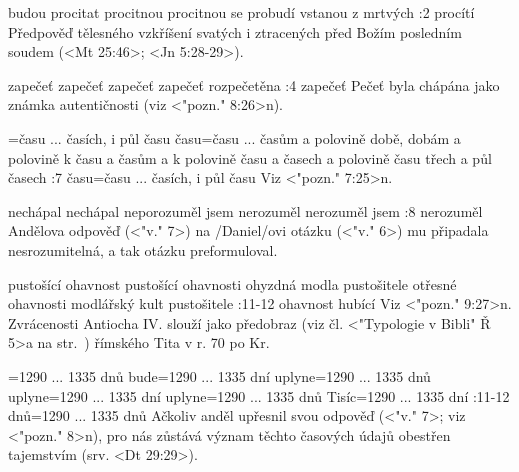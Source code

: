    {budou procitat} %
    {procitnou}  %
    {procitnou} %
    {se probudí}  %
    {vstanou z mrtvých}  %
:2 {procítí} Předpověď tělesného vzkříšení svatých i ztracených před Božím posledním soudem (<Mt 25:46>; <Jn 5:28-29>).

    {zapečeť} %
    {zapečeť}  %
    {zapečeť} %
    {zapečeť}  %
    {rozpečetěna}  %
:4 {zapečeť} Pečeť byla chápána jako známka autentičnosti (viz <"pozn." 8:26>n).

={času ... časích, i půl času}  %
    {času}={času ... časům a polovině} %
    {době, dobám a polovině}  %
    {k času a časům a k polovině} %
    {času a časech a polovině času}  %
    {třech a půl časech}  %
:7 {času}={času ... časích, i půl času} Viz <"pozn." 7:25>n.


    {nechápal} %
    {nechápal}  %
    {neporozuměl jsem} %
    {nerozuměl}  %
    {nerozuměl jsem}  %
:8 {nerozuměl} Andělova odpověď (<"v." 7>) na \x/Daniel/ovi otázku (<"v." 6>) mu připadala nesrozumitelná, a tak otázku preformuloval. 


    {pustošící ohavnost} %
    {pustošící ohavnosti}  %
    {ohyzdná modla pustošitele} %
    {otřesné ohavnosti}  %
    {modlářský kult pustošitele}  %
:11-12 {ohavnost hubící} Viz <"pozn." 9:27>n. Zvrácenosti Antiocha IV. slouží jako předobraz (viz čl. <"Typologie v Bibli" Ř 5>a na str.~\pg) římského Tita v r. 70 po Kr. 
 
={1290 ... 1335 dnů}      %
    {bude}={1290 ... 1335 dní}      %
    {uplyne}={1290 ... 1335 dnů}    %
    {uplyne}={1290 ... 1335 dní}    %
    {uplyne}={1290 ... 1335 dnů}    %
    {Tisíc}={1290 ... 1335 dní}     %
:11-12 {dnů}={1290 ... 1335 dnů} Ačkoliv anděl upřesnil svou odpověď (<"v." 7>; viz <"pozn." 8>n), pro nás zůstává význam těchto časových údajů obestřen tajemstvím (srv. <Dt 29:29>).



